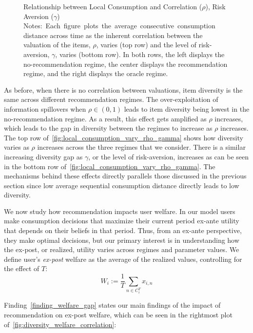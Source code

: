\documentclass[sigconf]{acmart}
\begin{document}
\begin{figure}[t]
\begin{subfigure}{.25\linewidth}
\end{subfigure}%
\caption{Relationship between Local Consumption and Correlation ($\rho$), Risk Aversion ($\gamma$)\hfill\break
\scriptsize{Notes:~Each~figure~plots~the~average~consecutive~consumption distance across time as the inherent correlation between the valuation of the items, $\rho$, varies (top row) and the level of risk-aversion, $\gamma$, varies (bottom row). In both rows, the left displays the no-recommendation regime, the center displays the recommendation regime, and the right displays the oracle regime.}}
\label{fig:local_consumption_vary_rho_gamma}
\end{figure}

As before, when there is no correlation between valuations, item diversity is the same across different recommendation regimes. The over-exploitation of information spillovers when $\rho \in (0,1)$ leads to item diversity being lowest in the no-recommendation regime. As a result, this effect gets amplified as $\rho$ increases, which leads to the gap in diversity between the regimes to increase as $\rho$ increases. The top row of~\autoref{fig:local_consumption_vary_rho_gamma} shows how diversity varies as $\rho$ increases across the three regimes that we consider. There is a similar increasing diversity gap as $\gamma$, or the level of risk-aversion, increases as can be seen in the bottom row of~\autoref{fig:local_consumption_vary_rho_gamma}. The mechanisms behind these effects directly parallels those discussed in the previous section since low average sequential consumption distance directly leads to low diversity.

 

We now study how recommendation impacts user welfare. In our model users make consumption decisions that maximize their current period ex-ante utility that depends on their beliefs in that period. Thus, from an ex-ante perspective, they make optimal decisions, but our primary interest is in understanding how the ex-post, or realized, utility varies across regimes and parameter values. We define user's \textit{ex-post} welfare as the average of the realized values, controlling for the effect of $T$:
$$W_i:= \frac{1}{T}\sum_{n \in C_i^T} x_{i,n}$$

\noindent Finding~\ref{finding_welfare_gap} states our main findings of the impact of recommendation on ex-post welfare, which can be seen in the rightmost plot of~\autoref{fig:diversity_welfare_correlation}:

~
\end{document}

